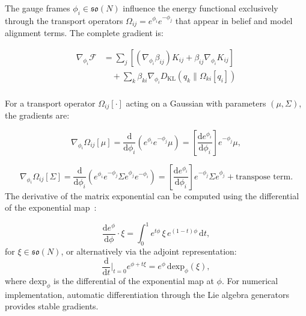 \documentclass[twoside,11pt]{article}
\begin{document}
The gauge frames $\phi_i \in \mathfrak{so}(N)$ influence the energy functional exclusively through the transport operators $\Omega_{ij} = e^{\phi_i} e^{-\phi_j}$ that appear in belief and model alignment terms. The complete gradient is:

\begin{align}
\nabla_{\phi_i} \mathcal{F} &=
\sum_j \left[(\nabla_{\phi_i} \beta_{ij}) K_{ij} + \beta_{ij} \nabla_{\phi_i} K_{ij}\right] \label{eq:grad_phi_complete_a} \\
&\quad + \sum_k \beta_{ki} \nabla_{\phi_i} D_{\mathrm{KL}}(q_k \| \Omega_{ki}[q_i]) \label{eq:grad_phi_complete_c} \\
\end{align}

For a transport operator $\Omega_{ij}[\cdot]$ acting on a Gaussian with parameters $(\mu, \Sigma)$, the gradients are:

\begin{equation}
\nabla_{\phi_i} \Omega_{ij}[\mu] = \frac{\mathrm{d}}{\mathrm{d}\phi_i}\left(e^{\phi_i} e^{-\phi_j} \mu\right) = \left[\frac{\mathrm{d} e^{\phi_i}}{\mathrm{d}\phi_i}\right] e^{-\phi_j} \mu,
\label{eq:grad_phi_transport_mu}
\end{equation}

\begin{equation}
\nabla_{\phi_i} \Omega_{ij}[\Sigma] = \frac{\mathrm{d}}{\mathrm{d}\phi_i}\left(e^{\phi_i} e^{-\phi_j} \Sigma e^{\phi_j} e^{-\phi_i}\right) = \left[\frac{\mathrm{d} e^{\phi_i}}{\mathrm{d}\phi_i}\right] e^{-\phi_j} \Sigma e^{\phi_j} + \text{transpose term}.
\label{eq:grad_phi_transport_sigma}
\end{equation}
The derivative of the matrix exponential can be computed using the differential of the exponential map~\citep{gallier2020differential}:

\begin{equation}
\frac{\mathrm{d} e^{\phi}}{\mathrm{d}\phi} \cdot \xi = \int_0^1 e^{t\phi} \, \xi \, e^{(1-t)\phi} \, \mathrm{d}t,
\label{eq:matrix_exp_differential}
\end{equation}
for $\xi \in \mathfrak{so}(N)$, or alternatively via the adjoint representation:
\begin{equation}
\frac{\mathrm{d}}{\mathrm{d}t}\Big|_{t=0} e^{\phi + t\xi} = e^{\phi} \, \mathrm{dexp}_\phi(\xi),
\label{eq:matrix_exp_adjoint}
\end{equation}
where $\mathrm{dexp}_\phi$ is the differential of the exponential map at $\phi$. For numerical implementation, automatic differentiation through the Lie algebra generators provides stable gradients.
\end{document}
